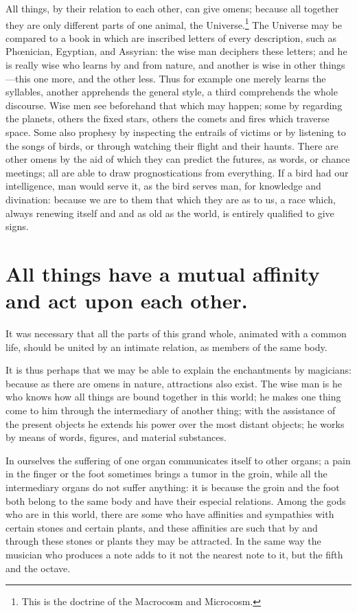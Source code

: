 \documentclass[12pt]{article}
\begin{document}
All things, by their relation to each other, can give omens; because all
together they are only different parts of one animal, the
Universe.\footnote{This is the doctrine of the Macrocosm and Microcosm.} The
Universe may be compared to a book in which are inscribed letters of every
description, such as Ph{\oe}nician, Egyptian, and Assyrian: the wise man
deciphers these letters; and he is really wise who learns by and from nature,
and another is wise in other things---this one more, and the other less. Thus
for example one merely learns the syllables, another apprehends the general
style, a third comprehends the whole discourse. Wise men see beforehand that
which may happen; some by regarding the planets, others the fixed stars, others
the comets and fires which traverse space. Some also prophesy by inspecting the
entrails of victims or by listening to the songs of birds, or through watching
their flight and their haunts. There are other omens by the aid of which they
can predict the futures, as words, or chance meetings; all are able to draw
prognostications from everything. If a bird had our intelligence, man would
serve it, as the bird serves man, for knowledge and divination: because we are
to them that which they are as to us, a race which, always renewing itself and
and as old as the world, is entirely qualified to give signs.


\section{All things have a mutual affinity and act upon each other.}

It was necessary that all the parts of this grand whole, animated with a common
life, should be united by an intimate relation, as members of the same body.

It is thus perhaps that we may be able to explain the enchantments by
magicians: because as there are omens in nature, attractions also exist. The
wise man is he who knows how all things are bound together in this world; he
makes one thing come to him through the intermediary of another thing; with the
assistance of the present objects he extends his power over the most distant
objects; he works by means of words, figures, and material substances.

In ourselves the suffering of one organ communicates itself to other organs; a
pain in the finger or the foot sometimes brings a tumor in the groin, while all
the intermediary organs do not suffer anything: it is because the groin and the
foot both belong to the same body and have their especial relations. Among the
gods who are in this world, there are some who have affinities and sympathies
with certain stones and certain plants, and these affinities are such that by
and through these stones or plants they may be attracted. In the same way the
musician who produces a note adds to it not the nearest note to it, but the
fifth and the octave.
\end{document}
